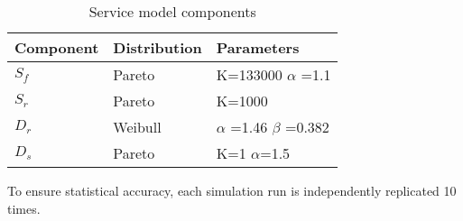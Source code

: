 \begin{table}[tb]
	\centering
	
    \begin{tabular}{|l|l|l|}\hline
    	\textbf{Component}  	& \textbf{Distribution} 	& \textbf{Parameters}     \\ \hline
    	$S_f$   & Pareto   				& K=133000 $\alpha$ =1.1  \\ \hline
    	$S_r$   & Pareto    				& K=1000         \\ \hline
    	$D_r$ 	& Weibull    				& $\alpha$ =1.46 $\beta$ =0.382 \\ \hline
    	$D_s$ 	& Pareto     				& K=1 $\alpha$=1.5      \\ \hline
    \end{tabular}
    
    \caption{Service model components}
    \label{table:traffic_parameters}
\end{table}

To ensure statistical accuracy, each simulation run is independently replicated 10 times.